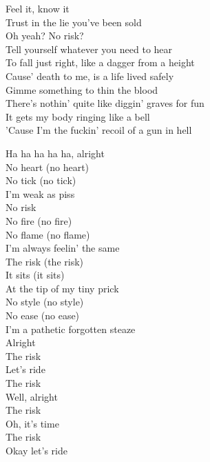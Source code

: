 


Feel it, know it\\
Trust in the lie you've been sold\\
Oh yeah? No risk?\\
Tell yourself whatever you need to hear\\
To fall just right, like a dagger from a height\\
Cause' death to me, is a life lived safely\\

Gimme something to thin the blood\\
There's nothin' quite like diggin' graves for fun\\
It gets my body ringing like a bell\\
'Cause I'm the fuckin' recoil of a gun in hell\\


Ha ha ha ha ha, alright\\
No heart (no heart)\\
No tick (no tick)\\
I'm weak as piss\\
No risk\\
No fire (no fire)\\
No flame (no flame)\\
I'm always feelin' the same\\
The risk (the risk)\\
It sits (it sits)\\
At the tip of my tiny prick\\
No style (no style)\\
No ease (no ease)\\
I'm a pathetic forgotten steaze\\

Alright\\
The risk\\
Let's ride\\
The risk\\
Well, alright\\
The risk\\
Oh, it's time\\
The risk\\
Okay let's ride\\

